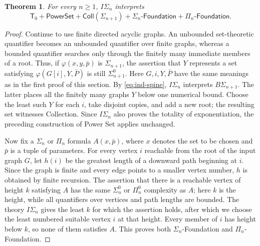 \documentclass[11pt,a4paper]{article}
\newcommand{\IS}[1]{I\Sigma_{#1}}
\newcommand{\Tzero}{\mathsf T_{0}}
\newcommand{\Coll}[1]{\mathsf{Coll}(#1)}
\newcommand{\Fnd}[1]{#1\text{-}\mathsf{Foundation}}
\newcommand{\Pow}{\mathsf{PowerSet}}
\theoremstyle{plain}
\newtheorem{theorem}{Theorem}[section]
\theoremstyle{definition}
\theoremstyle{remark}
\begin{document}
\begin{theorem}
  For every \(n\geq1\), \(\IS{n}\) interprets
  \[
    \Tzero+\Pow+\Coll{\Sigma_{n+1}}+\Fnd{\Sigma_n}+\Fnd{\Pi_n}.
  \]
\end{theorem}
\begin{proof}
  Continue to use finite directed acyclic graphs. An unbounded set-theoretic quantifier becomes an unbounded quantifier over finite graphs, whereas a bounded quantifier searches only through the finitely many immediate members of a root. Thus, if \(\varphi(x,y,\bar p)\) is \(\Sigma_{n+1}\), the assertion that \(Y\) represents a set satisfying \(\varphi(G[i],Y,\bar P)\) is still \(\Sigma_{n+1}^0\). Here \(G,i,Y,\bar P\) have the same meanings as in the first proof of this section. By \eqref{eq:ind-spine}, \(I\Sigma_n\) interprets \(B\Sigma_{n+1}\). The latter places all the finitely many graphs \(Y\) below one numerical bound. Choose the least such \(Y\) for each \(i\), take disjoint copies, and add a new root; the resulting set witnesses Collection. Since \(I\Sigma_n\) also proves the totality of exponentiation, the preceding construction of Power Set applies unchanged.

  Now fix a \(\Sigma_n\) or \(\Pi_n\) formula \(A(x,\bar p)\), where \(x\) denotes the set to be chosen and \(\bar p\) is a tuple of parameters. For every vertex \(i\) reachable from the root of the input graph \(G\), let \(h(i)\) be the greatest length of a downward path beginning at \(i\). Since the graph is finite and every edge points to a smaller vertex number, \(h\) is obtained by finite recursion. The assertion that there is a reachable vertex of height \(k\) satisfying \(A\) has the same \(\Sigma_n^0\) or \(\Pi_n^0\) complexity as \(A\); here \(k\) is the height, while all quantifiers over vertices and path lengths are bounded. The theory \(I\Sigma_n\) gives the least \(k\) for which the assertion holds, after which we choose the least numbered suitable vertex \(i\) at that height. Every member of \(i\) has height below \(k\), so none of them satisfies \(A\). This proves both \(\Sigma_n\)-Foundation and \(\Pi_n\)-Foundation.
\end{proof}
\end{document}
